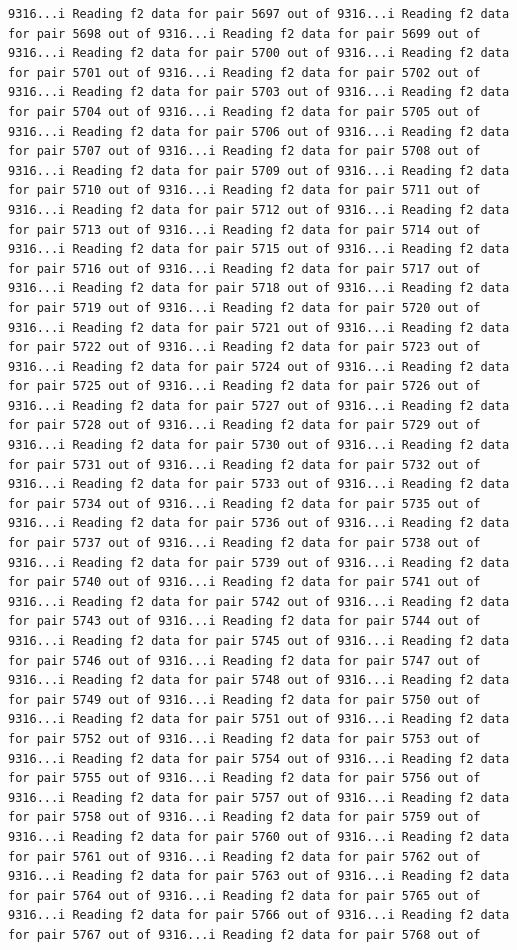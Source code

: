 \documentclass[
]{article}
\begin{document}
\begin{verbatim}
9316...i Reading f2 data for pair 5697 out of 9316...i Reading f2 data for pair 5698 out of 9316...i Reading f2 data for pair 5699 out of 9316...i Reading f2 data for pair 5700 out of 9316...i Reading f2 data for pair 5701 out of 9316...i Reading f2 data for pair 5702 out of 9316...i Reading f2 data for pair 5703 out of 9316...i Reading f2 data for pair 5704 out of 9316...i Reading f2 data for pair 5705 out of 9316...i Reading f2 data for pair 5706 out of 9316...i Reading f2 data for pair 5707 out of 9316...i Reading f2 data for pair 5708 out of 9316...i Reading f2 data for pair 5709 out of 9316...i Reading f2 data for pair 5710 out of 9316...i Reading f2 data for pair 5711 out of 9316...i Reading f2 data for pair 5712 out of 9316...i Reading f2 data for pair 5713 out of 9316...i Reading f2 data for pair 5714 out of 9316...i Reading f2 data for pair 5715 out of 9316...i Reading f2 data for pair 5716 out of 9316...i Reading f2 data for pair 5717 out of 9316...i Reading f2 data for pair 5718 out of 9316...i Reading f2 data for pair 5719 out of 9316...i Reading f2 data for pair 5720 out of 9316...i Reading f2 data for pair 5721 out of 9316...i Reading f2 data for pair 5722 out of 9316...i Reading f2 data for pair 5723 out of 9316...i Reading f2 data for pair 5724 out of 9316...i Reading f2 data for pair 5725 out of 9316...i Reading f2 data for pair 5726 out of 9316...i Reading f2 data for pair 5727 out of 9316...i Reading f2 data for pair 5728 out of 9316...i Reading f2 data for pair 5729 out of 9316...i Reading f2 data for pair 5730 out of 9316...i Reading f2 data for pair 5731 out of 9316...i Reading f2 data for pair 5732 out of 9316...i Reading f2 data for pair 5733 out of 9316...i Reading f2 data for pair 5734 out of 9316...i Reading f2 data for pair 5735 out of 9316...i Reading f2 data for pair 5736 out of 9316...i Reading f2 data for pair 5737 out of 9316...i Reading f2 data for pair 5738 out of 9316...i Reading f2 data for pair 5739 out of 9316...i Reading f2 data for pair 5740 out of 9316...i Reading f2 data for pair 5741 out of 9316...i Reading f2 data for pair 5742 out of 9316...i Reading f2 data for pair 5743 out of 9316...i Reading f2 data for pair 5744 out of 9316...i Reading f2 data for pair 5745 out of 9316...i Reading f2 data for pair 5746 out of 9316...i Reading f2 data for pair 5747 out of 9316...i Reading f2 data for pair 5748 out of 9316...i Reading f2 data for pair 5749 out of 9316...i Reading f2 data for pair 5750 out of 9316...i Reading f2 data for pair 5751 out of 9316...i Reading f2 data for pair 5752 out of 9316...i Reading f2 data for pair 5753 out of 9316...i Reading f2 data for pair 5754 out of 9316...i Reading f2 data for pair 5755 out of 9316...i Reading f2 data for pair 5756 out of 9316...i Reading f2 data for pair 5757 out of 9316...i Reading f2 data for pair 5758 out of 9316...i Reading f2 data for pair 5759 out of 9316...i Reading f2 data for pair 5760 out of 9316...i Reading f2 data for pair 5761 out of 9316...i Reading f2 data for pair 5762 out of 9316...i Reading f2 data for pair 5763 out of 9316...i Reading f2 data for pair 5764 out of 9316...i Reading f2 data for pair 5765 out of 9316...i Reading f2 data for pair 5766 out of 9316...i Reading f2 data for pair 5767 out of 9316...i Reading f2 data for pair 5768 out of 
\end{verbatim}
\end{document}

